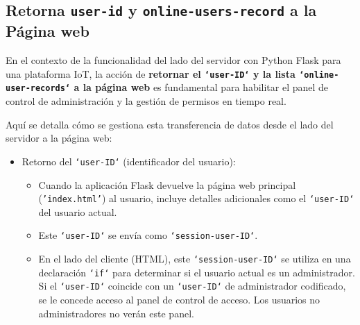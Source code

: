 \documentclass{report}
\begin{document}
\subsection{Retorna \texttt{user-id} y \texttt{online-users-record} a la Página web}
En el contexto de la funcionalidad del lado del servidor con Python Flask para una plataforma IoT, la acción de \textbf{retornar el \texttt{`user-ID`} 
y la lista \texttt{`online-user-records`} a la página web} es fundamental para habilitar el panel de control de administración y la gestión de permisos 
en tiempo real.

Aquí se detalla cómo se gestiona esta transferencia de datos desde el lado del servidor a la página web:
\begin{itemize}
    \item Retorno del \texttt{`user-ID`} (identificador del usuario):
        \begin{itemize}
            \item Cuando la aplicación Flask devuelve la página web principal (\texttt{'index.html'}) al usuario, incluye detalles adicionales como el 
            \texttt{`user-ID`} del usuario actual.
            \item Este \texttt{`user-ID`} se envía como \texttt{`session-user-ID`}.
            \item En el lado del cliente (HTML), este \texttt{`session-user-ID`} se utiliza en una declaración \texttt{`if`} para determinar si el usuario 
            actual es un administrador. Si el \texttt{`user-ID`} coincide con un \texttt{`user-ID`} de administrador codificado, se le concede acceso al 
            panel de control de acceso. Los usuarios no administradores no verán este panel.
        \end{itemize}


\end{itemize}
\end{document}
